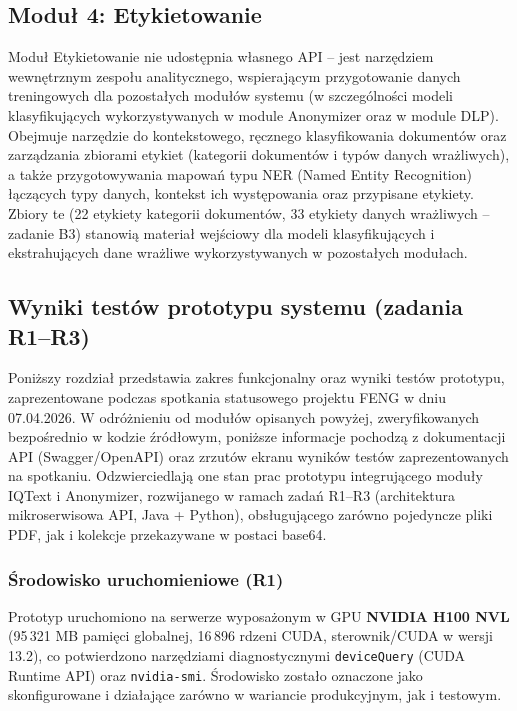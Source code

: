 \subsection*{Moduł 4: Etykietowanie}

Moduł Etykietowanie nie udostępnia własnego API -- jest narzędziem wewnętrznym zespołu analitycznego, wspierającym przygotowanie danych treningowych dla pozostałych modułów systemu (w szczególności modeli klasyfikujących wykorzystywanych w module Anonymizer oraz w module DLP). Obejmuje narzędzie do kontekstowego, ręcznego klasyfikowania dokumentów oraz zarządzania zbiorami etykiet (kategorii dokumentów i typów danych wrażliwych), a także przygotowywania mapowań typu NER (Named Entity Recognition) łączących typy danych, kontekst ich występowania oraz przypisane etykiety. Zbiory te (22 etykiety kategorii dokumentów, 33 etykiety danych wrażliwych -- zadanie B3) stanowią materiał wejściowy dla modeli klasyfikujących i ekstrahujących dane wrażliwe wykorzystywanych w pozostałych modułach.

\subsection*{Wyniki testów prototypu systemu (zadania R1--R3)}

Poniższy rozdział przedstawia zakres funkcjonalny oraz wyniki testów prototypu, zaprezentowane podczas spotkania statusowego projektu FENG w dniu 07.04.2026. W odróżnieniu od modułów opisanych powyżej, zweryfikowanych bezpośrednio w kodzie źródłowym, poniższe informacje pochodzą z dokumentacji API (Swagger/OpenAPI) oraz zrzutów ekranu wyników testów zaprezentowanych na spotkaniu. Odzwierciedlają one stan prac prototypu integrującego moduły IQText i Anonymizer, rozwijanego w ramach zadań R1--R3 (architektura mikroserwisowa API, Java + Python), obsługującego zarówno pojedyncze pliki PDF, jak i kolekcje przekazywane w postaci base64.

\subsubsection*{Środowisko uruchomieniowe (R1)}

Prototyp uruchomiono na serwerze wyposażonym w GPU \textbf{NVIDIA H100 NVL} (95\,321 MB pamięci globalnej, 16\,896 rdzeni CUDA, sterownik/CUDA w wersji 13.2), co potwierdzono narzędziami diagnostycznymi \texttt{deviceQuery} (CUDA Runtime API) oraz \texttt{nvidia-smi}. Środowisko zostało oznaczone jako skonfigurowane i działające zarówno w wariancie produkcyjnym, jak i testowym.

